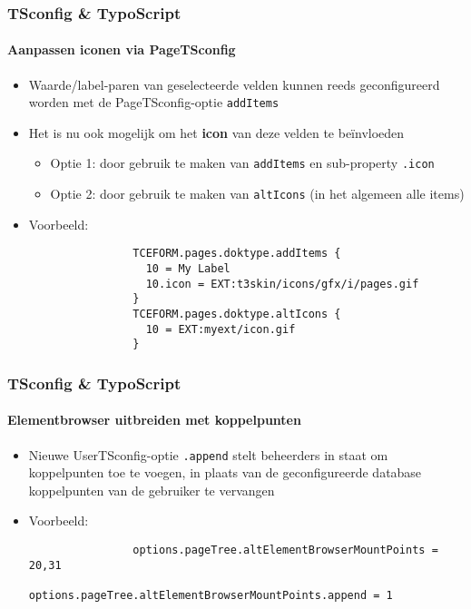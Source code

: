 \begin{frame}[fragile]
	\frametitle{TSconfig \& TypoScript}
	\framesubtitle{Aanpassen iconen via PageTSconfig}

	\begin{itemize}
		\item Waarde/label-paren van geselecteerde velden kunnen reeds geconfigureerd worden met de 
		PageTSconfig-optie \texttt{addItems}
		\item Het is nu ook mogelijk om het \textbf{icon} van deze velden te beïnvloeden

			\begin{itemize}
				\item Optie 1: door gebruik te maken van \texttt{addItems} en sub-property \texttt{.icon}
				\item Optie 2: door gebruik te maken van \texttt{altIcons} (in het algemeen alle items)
			\end{itemize}

		\item Voorbeeld:

			\begin{lstlisting}
				TCEFORM.pages.doktype.addItems {
				  10 = My Label
				  10.icon = EXT:t3skin/icons/gfx/i/pages.gif
				}
				TCEFORM.pages.doktype.altIcons {
				  10 = EXT:myext/icon.gif
				}
			\end{lstlisting}

	\end{itemize}

\end{frame}


\begin{frame}[fragile]
	\frametitle{TSconfig \& TypoScript}
	\framesubtitle{Elementbrowser uitbreiden met koppelpunten}

	\begin{itemize}
		\item Nieuwe UserTSconfig-optie \texttt{.append} stelt beheerders in staat om 
			koppelpunten toe te voegen, in plaats van de geconfigureerde database koppelpunten 
			van de gebruiker te vervangen 

		\item Voorbeeld:

			\begin{lstlisting}
				options.pageTree.altElementBrowserMountPoints = 20,31
				options.pageTree.altElementBrowserMountPoints.append = 1
			\end{lstlisting}

	\end{itemize}

\end{frame}

